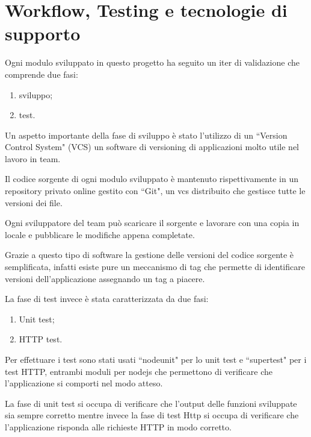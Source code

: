 \chapter{Workflow, Testing e tecnologie di supporto}
Ogni modulo sviluppato in questo progetto ha seguito un iter di validazione che comprende due fasi:
\begin{enumerate}
	\item sviluppo;
	\item test.
\end{enumerate}

Un aspetto importante della fase di sviluppo è stato l'utilizzo di un ``Version Control System" (VCS) un software di versioning di applicazioni molto utile nel lavoro in team. 

Il codice sorgente di ogni modulo sviluppato è mantenuto rispettivamente in un repository privato online gestito con ``Git", un vcs distribuito che gestisce tutte le versioni dei file. 

Ogni sviluppatore del team può scaricare il sorgente e lavorare con una copia in locale e pubblicare le modifiche appena completate. 

Grazie a questo tipo di software la gestione delle versioni del codice sorgente è semplificata, infatti esiste pure un meccanismo di tag che permette di identificare versioni dell'applicazione assegnando un tag a piacere.
\newline

La fase di test invece è stata caratterizzata da due fasi:
\begin{enumerate}
	\item Unit test;
	\item HTTP test.
\end{enumerate}

Per effettuare i test sono stati usati ``nodeunit" per lo unit test e ``supertest" per i test HTTP, entrambi moduli per nodejs che permettono di verificare che l'applicazione si comporti nel modo atteso. 

La fase di unit test si occupa di verificare che l'output delle funzioni sviluppate sia sempre corretto mentre invece la fase di test Http si occupa di verificare che l'applicazione risponda alle richieste HTTP in modo corretto.
